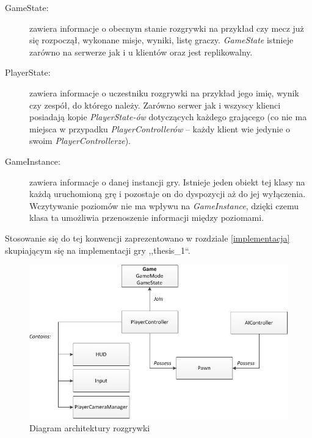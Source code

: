 \documentclass[multip]{SGGW-thesis}
\begin{document}
\begin{description}
\item[GameState:] zawiera informacje o obecnym stanie rozgrywki na przykład czy mecz już się rozpoczął, wykonane misje, wyniki, listę graczy. {\em GameState} istnieje zarówno na serwerze jak i u klientów oraz jest replikowalny.
\item[PlayerState:] zawiera informacje o uczestniku rozgrywki na przykład jego imię, wynik czy zespół, do którego należy. Zarówno serwer jak i wszyscy klienci posiadają kopie {\em PlayerState-ów} dotyczących każdego grającego (co nie ma miejsca w przypadku {\em PlayerControllerów} -- każdy klient wie jedynie o swoim {\em PlayerControllerze}).
\item[GameInstance:] zawiera informacje o danej instancji gry. Istnieje jeden obiekt tej klasy na każdą uruchomioną grę i pozostaje on do dyspozycji aż do jej wyłączenia. Wczytywanie poziomów nie ma wpływu na {\em GameInstance}, dzięki czemu klasa ta umożliwia przenoszenie informacji między poziomami.
\end{description}
Stosowanie się do tej konwencji zaprezentowano w rozdziale \ref{implementacja} skupiającym się na implementacji gry ,,thesis\_1``.

\begin{figure}
	\centering
		\includegraphics[width=1\textwidth]{figures/gameplay_chart.jpg}
	\caption{Diagram architektury rozgrywki}
	\label{fig-gameplay-chart}
\end{figure}
\end{document}
